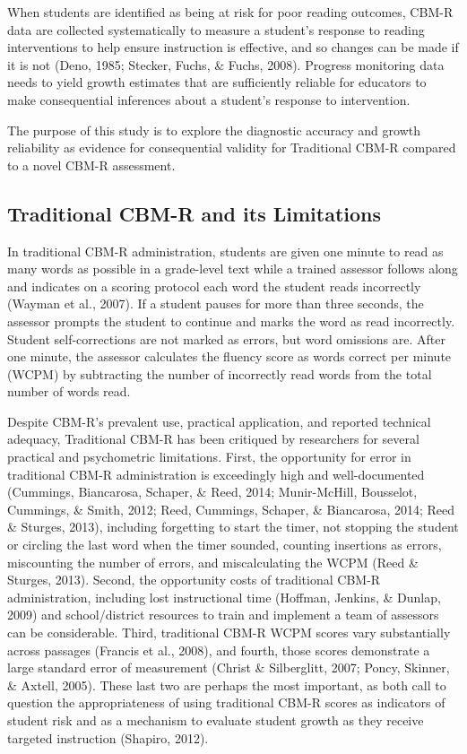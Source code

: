 \documentclass[
  english,
  man, fleqn, noextraspace]{apa6}
\begin{document}
When students are identified as being at risk for poor reading outcomes, CBM-R data are collected systematically to measure a student's response to reading interventions to help ensure instruction is effective, and so changes can be made if it is not (Deno, 1985; Stecker, Fuchs, \& Fuchs, 2008). Progress monitoring data needs to yield growth estimates that are sufficiently reliable for educators to make consequential inferences about a student's response to intervention.

The purpose of this study is to explore the diagnostic accuracy and growth reliability as evidence for consequential validity for Traditional CBM-R compared to a novel CBM-R assessment.

\hypertarget{traditional-cbm-r-and-its-limitations}{%
\subsection{Traditional CBM-R and its Limitations}\label{traditional-cbm-r-and-its-limitations}}

In traditional CBM-R administration, students are given one minute to read as many words as possible in a grade-level text while a trained assessor follows along and indicates on a scoring protocol each word the student reads incorrectly (Wayman et al., 2007). If a student pauses for more than three seconds, the assessor prompts the student to continue and marks the word as read incorrectly. Student self-corrections are not marked as errors, but word omissions are. After one minute, the assessor calculates the fluency score as words correct per minute (WCPM) by subtracting the number of incorrectly read words from the total number of words read.

Despite CBM-R's prevalent use, practical application, and reported technical adequacy, Traditional CBM-R has been critiqued by researchers for several practical and psychometric limitations. First, the opportunity for error in traditional CBM-R administration is exceedingly high and well-documented (Cummings, Biancarosa, Schaper, \& Reed, 2014; Munir-McHill, Bousselot, Cummings, \& Smith, 2012; Reed, Cummings, Schaper, \& Biancarosa, 2014; Reed \& Sturges, 2013), including forgetting to start the timer, not stopping the student or circling the last word when the timer sounded, counting insertions as errors, miscounting the number of errors, and miscalculating the WCPM (Reed \& Sturges, 2013). Second, the opportunity costs of traditional CBM-R administration, including lost instructional time (Hoffman, Jenkins, \& Dunlap, 2009) and school/district resources to train and implement a team of assessors can be considerable. Third, traditional CBM-R WCPM scores vary substantially across passages (Francis et al., 2008), and fourth, those scores demonstrate a large standard error of measurement (Christ \& Silberglitt, 2007; Poncy, Skinner, \& Axtell, 2005). These last two are perhaps the most important, as both call to question the appropriateness of using traditional CBM-R scores as indicators of student risk and as a mechanism to evaluate student growth as they receive targeted instruction (Shapiro, 2012).
\end{document}
